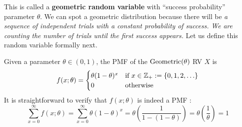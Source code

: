  This is called a {\bf geometric random variable} with ``success
 probability'' parameter $\theta$. We can spot a geometric distribution
 because there will be  {\em a sequence of independent  trials with a constant
   probability  of success. We are counting the number of trials until
   the first success appears.} Let us define this random variable formally next.

\begin{model}\label{M:GeomRV}
Given a parameter $\theta \in (0,1)$, the PMF of the $\mbox{{\rm Geometric}}(\theta)$ RV $X$ is
\begin{equation}\label{E:Geometricpdf}
f(x;\theta) =
\begin{cases}
\theta(1-\theta)^{x} & \text{if $x \in \mathbb{Z}_+ := \{0,1,2,\ldots \}$} \\
0 & \text{otherwise}
\end{cases}
\end{equation}
It is straightforward to verify that $f(x;\theta)$ is indeed a PMF :
\[
\sum_{x=0}^{\infty} f(x;\theta) = \sum_{x=0}^{\infty} \theta(1-\theta)^{x}
= \theta \left( \frac{1}{1-(1-\theta)} \right) =  \theta \left( \frac{1}{\theta} \right) = 1
\]


\end{model}
